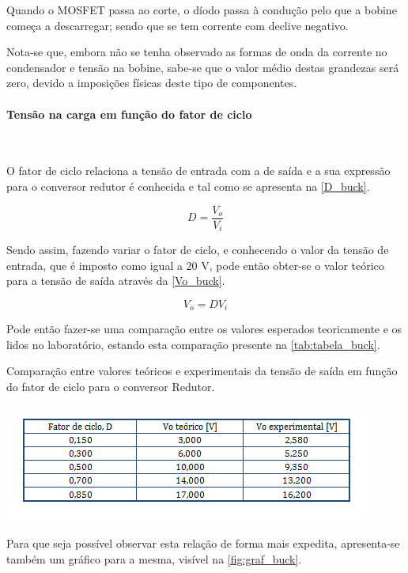 \documentclass[a4paper,11pt]{article}
\numberwithin{equation}{section}
\begin{document}
Quando o MOSFET passa ao corte, o díodo passa à condução pelo que a bobine começa a descarregar; sendo que se tem corrente com declive negativo. 

Nota-se que, embora não se tenha observado as formas de onda da corrente no condensador e tensão na bobine, sabe-se que o valor médio destas grandezas será zero, devido a imposições físicas deste tipo de componentes.

\paragraph{Tensão na carga em função do fator de ciclo}\mbox{}\

O fator de ciclo relaciona a tensão de entrada com a de saída e a sua expressão para o conversor redutor é conhecida e tal como se apresenta na \autoref{D_buck}.

\begin{equation}
	D= \frac{V_o}{V_i} \label{D_buck}
\end{equation}

Sendo assim, fazendo variar o fator de ciclo, e conhecendo o valor da tensão de entrada, que é imposto como igual a $20$ V, pode então obter-se o valor teórico para a tensão de saída através da \autoref{Vo_buck}.

\begin{equation}
V_o= D V_i \label{Vo_buck}
\end{equation}

Pode então fazer-se uma comparação entre os valores esperados teoricamente e os lidos no laboratório, estando esta comparação presente na \autoref{tab:tabela_buck}.

\begin{table}[!htb]
	\centering
	\caption{Comparação entre valores teóricos e experimentais da tensão de saída em função do fator de ciclo para o conversor Redutor.}
	\includegraphics[width=0.8\linewidth]{teoricas/tabela_buck}
	\label{tab:tabela_buck}
\end{table}

Para que seja possível observar esta relação de forma mais expedita, apresenta-se também um gráfico para a mesma, visível na \autoref{fig:graf_buck}.
\end{document}
